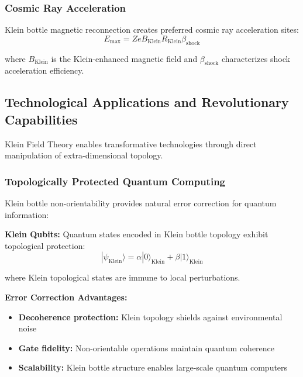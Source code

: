 \documentclass[12pt]{iopart}
\begin{document}
\subsubsection{Cosmic Ray Acceleration}

Klein bottle magnetic reconnection creates preferred cosmic ray acceleration sites:
\begin{equation}
E_{\text{max}} = Z e B_{\text{Klein}} R_{\text{Klein}} \beta_{\text{shock}}
\label{eq:cosmic_ray_acceleration}
\end{equation}

where $B_{\text{Klein}}$ is the Klein-enhanced magnetic field and $\beta_{\text{shock}}$ characterizes shock acceleration efficiency.

\subsection{Technological Applications and Revolutionary Capabilities}

Klein Field Theory enables transformative technologies through direct manipulation of extra-dimensional topology.

\subsubsection{Topologically Protected Quantum Computing}

Klein bottle non-orientability provides natural error correction for quantum information:

\textbf{Klein Qubits:} Quantum states encoded in Klein bottle topology exhibit topological protection:
\begin{equation}
|\psi_{\text{Klein}}\rangle = \alpha |0\rangle_{\text{Klein}} + \beta |1\rangle_{\text{Klein}}
\label{eq:klein_qubit}
\end{equation}

where Klein topological states are immune to local perturbations.

\textbf{Error Correction Advantages:}
\begin{itemize}
\item \textbf{Decoherence protection:} Klein topology shields against environmental noise
\item \textbf{Gate fidelity:} Non-orientable operations maintain quantum coherence
\item \textbf{Scalability:} Klein bottle structure enables large-scale quantum computers
\end{itemize}
\end{document}
